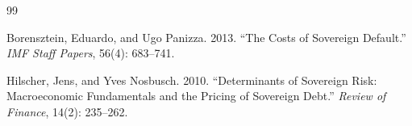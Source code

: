 \documentclass[12pt]{article}
\begin{document}

\begin{thebibliography}{99}

Borensztein, Eduardo, and Ugo Panizza. 2013. ``The Costs of Sovereign Default.'' \textit{IMF Staff Papers}, 56(4): 683--741.

Hilscher, Jens, and Yves Nosbusch. 2010. ``Determinants of Sovereign Risk: Macroeconomic Fundamentals and the Pricing of Sovereign Debt.'' \textit{Review of Finance}, 14(2): 235--262.

\end{thebibliography}
\end{document}
